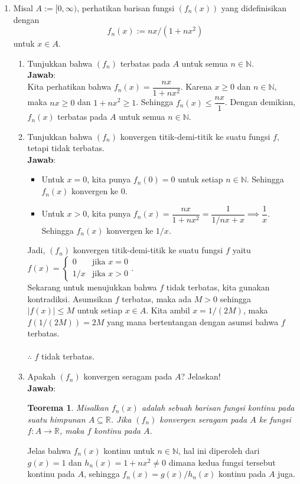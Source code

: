 \documentclass[12pt,openany,a4paper]{article}
\newtheorem*{teorema}{Teorema}
\newcommand{\R}{\mathbb{R}}
\newcommand{\N}{\mathbb{N}}
\newcommand{\jawab}{\textbf{Jawab}:}
\begin{document}
\begin{enumerate}
    \item Misal $A:=[0,\infty)$, perhatikan barisan fungsi $(f_n(x))$ yang didefinisikan dengan
    \[f_n(x):=nx/(1+nx^2)\]
    untuk $x\in A$.
    \begin{enumerate}
        \item Tunjukkan bahwa $(f_n)$ terbatas pada $A$ untuk semua $n\in\N$.\\
            \jawab\\
            Kita perhatikan bahwa $f_n(x)=\dfrac{nx}{1+nx^2}$. Karena $x\geq 0$ dan $n\in\N$, 
            maka $nx\geq 0$ dan $1+nx^2\geq 1$. Sehingga $f_n(x)\leq \dfrac{nx}{1}$. Dengan 
            demikian, $f_n(x)$ terbatas pada $A$ untuk semua $n\in\N$.
            
            \item Tunjukkan bahwa $(f_n)$ konvergen titik-demi-titik ke suatu fungsi $f$, tetapi tidak terbatas.\\
            \jawab
            \begin{itemize}
                \item Untuk $x=0$, kita punya $f_n(0)=0$ untuk setiap $n\in\N$. Sehingga $f_n(x)$ konvergen ke $0$.
                \item Untuk $x>0$, kita punya $f_n(x)=\dfrac{nx}{1+nx^2}=\dfrac{1}{1/nx+x}\implies\dfrac{1}{x}$. 
                Sehingga $f_n(x)$ konvergen ke $1/x$.
            \end{itemize}
            Jadi, $(f_n)$ konvergen titik-demi-titik ke suatu fungsi $f$ yaitu $f(x)=\begin{cases}0&\text{jika }x=0\\1/x&\text{jika }x>0\end{cases}$.\\
            Sekarang untuk menujukkan bahwa $f$ tidak terbatas, kita gunakan kontradiksi. 
            Asumsikan $f$ terbatas, maka ada $M>0$ sehingga $|f(x)|\leq M$ untuk setiap $x\in A$. 
            Kita ambil $x=1/(2M)$, maka $f(1/(2M))=2M$ yang mana bertentangan dengan asumsi bahwa $f$ terbatas.\\\\
            $\therefore$ $f$ tidak terbatas.\\

            \item Apakah $(f_n)$ konvergen seragam pada $A$? Jelaskan!\\
            \jawab
            \begin{teorema}
                Misalkan $f_n(x)$ adalah sebuah barisan fungsi kontinu pada suatu himpunan 
                $A \subseteq \R$. Jika $(f_n)$ konvergen seragam pada $A$ ke fungsi $f : A \to \R$, 
                maka $f$ kontinu pada $A$.
            \end{teorema}
            Jelas bahwa $f_n(x)$ kontinu untuk $n\in\N$, hal ini diperoleh dari $g(x)=1$ dan 
            $h_n(x)=1+nx^2\ne 0$ dimana kedua fungsi tersebut kontinu pada $A$, sehingga 
            $f_n(x)=g(x)/h_n(x)$ kontinu pada $A$ juga.
            

\end{enumerate}
\end{enumerate}
\end{document}
